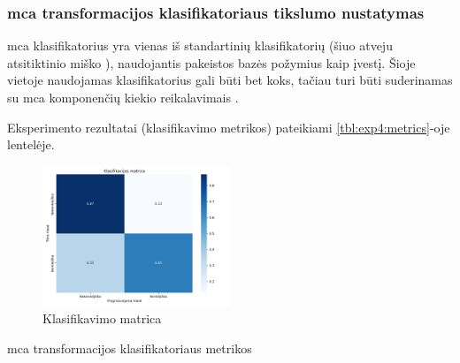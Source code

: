 \subsubsection{\gls{mca} transformacijos klasifikatoriaus tikslumo nustatymas}

\gls{mca} klasifikatorius yra vienas iš standartinių klasifikatorių (šiuo atveju atsitiktinio miško ), naudojantis pakeistos bazės požymius kaip įvestį. Šioje vietoje naudojamas klasifikatorius gali būti bet koks, tačiau turi būti suderinamas su \gls{mca} komponenčių kiekio reikalavimais .

\TODO

Eksperimento rezultatai (klasifikavimo metrikos) pateikiami \ref{tbl:exp4:metrics}-oje lentelėje.
\begin{figure}[h]
    \centering
    \includegraphics[width=0.5\textwidth]{images/mca_2x2.png}
    \caption{Klasifikavimo matrica}
    \label{fig:exp4:confusion}
\end{figure}

\begin{table}[h]
    \caption{\gls{mca} transformacijos klasifikatoriaus metrikos}
    \centering
    \label{tbl:exp4:metrics}
\end{table}